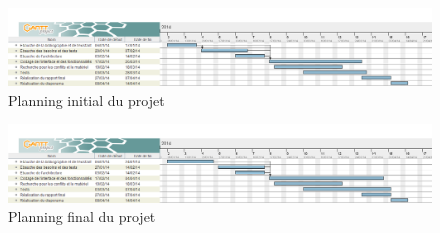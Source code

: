 \documentclass[16pts]{report}
\begin{document}
\begin{enumerate}




	\begin{figure}
		\includegraphics[scale=0.5]{../illustrations/planning_initial_pdp.png}
		\centering
		\caption{Planning initial du projet}
		\label{fig:PlanningInitial}
	\end{figure}

	\begin{figure}
		\includegraphics[scale=0.5]{../illustrations/planning_final_pdp.png}
		\centering
		\caption{Planning final du projet}
		\label{fig:PlanningFinal}
	\end{figure}


\end{enumerate}
\end{document}
